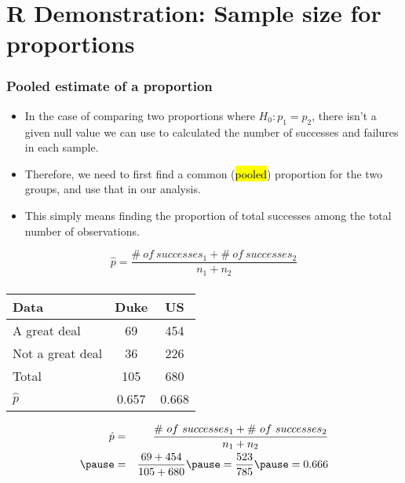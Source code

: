 \documentclass[slidestop,compress,mathserif]{beamer}
\newcommand{\soln}[1]{\textit{#1}}
\begin{document}
\section{R Demonstration: Sample size for proportions}

\begin{frame}
\frametitle{Pooled estimate of a proportion}

\begin{itemize}

\item In the case of comparing two proportions where $H_0: p_1 = p_2$, there isn't a given null value we can use to calculated the  number of successes and failures in each sample.

\pause

\item Therefore, we need to first find a common (\hl{pooled}) proportion for the two groups, and use that in our analysis.

\pause

\item This simply means finding the proportion of total successes among the total number of observations.

\end{itemize}

$\:$ \\

{ \[ \hat{p} = \frac{\#~of~successes_1 + \#~of~successes_2}{n_1 + n_2} \] }

\end{frame}


\begin{frame}
\frametitle{}


{\footnotesize
\begin{center}
\begin{tabular}{l | c c}
Data			& Duke		& US \\
\hline
A great deal	& 69			& 454 \\
Not a great deal& 36			& 226 \\
\hline
Total			& 105		& 680 \\
\hline
$\hat{p}$		& 0.657		& 0.668
\end{tabular}
\end{center}
}

\pause

\soln{
\begin{eqnarray*}
\hat{p} &=& \frac{\#~of~successes_1 + \#~of~successes_2}{n_1 + n_2} \\
\pause
&=& \frac{69+454}{105+680} \pause = \frac{523}{785} \pause = 0.666
\end{eqnarray*}
}

\end{frame}
\end{document}
